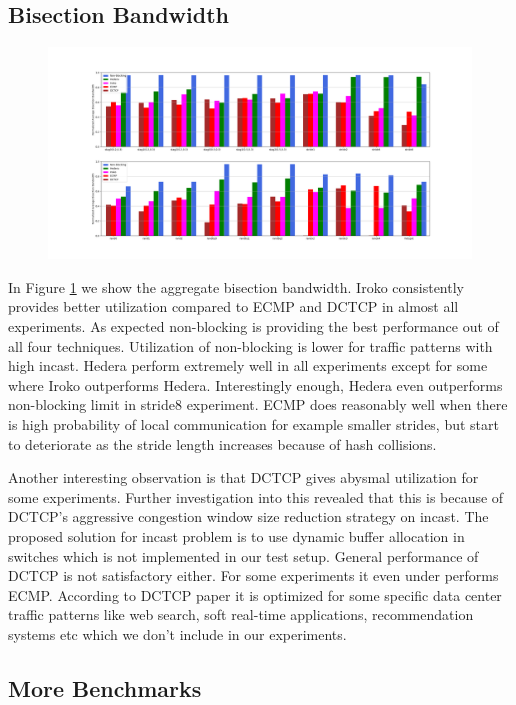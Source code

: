\subsection{Bisection Bandwidth}

\begin{figure} 
	\centering 
	\includegraphics[width=1\linewidth]{rate.png} 
	\caption{}
	\label{fig:rate} 
\end{figure}

In Figure \ref{fig:rate} we show the aggregate bisection bandwidth. Iroko
consistently provides better utilization compared to ECMP and DCTCP in almost
all experiments. As expected non-blocking is providing the best performance out
of all four techniques. Utilization of non-blocking is lower for traffic
patterns with high incast. Hedera perform extremely well in all experiments
except for some where Iroko outperforms Hedera. Interestingly enough, Hedera
even outperforms non-blocking limit in stride8 experiment. ECMP does reasonably
well when there is high probability of local communication for example smaller
strides, but start to deteriorate as the stride length increases because of hash
collisions.

Another interesting observation is that DCTCP gives abysmal utilization for some
experiments. Further investigation into this revealed that this is because of
DCTCP's aggressive congestion window size reduction strategy on incast. The
proposed solution for incast problem is to use dynamic buffer allocation in
switches which is not implemented in our test setup. General performance of
DCTCP is not satisfactory either. For some experiments it even under performs
ECMP.  According to DCTCP paper it is optimized for some specific data center
traffic patterns like web search, soft real-time applications, recommendation
systems etc which we don't include in our experiments.

\subsection{More Benchmarks}

